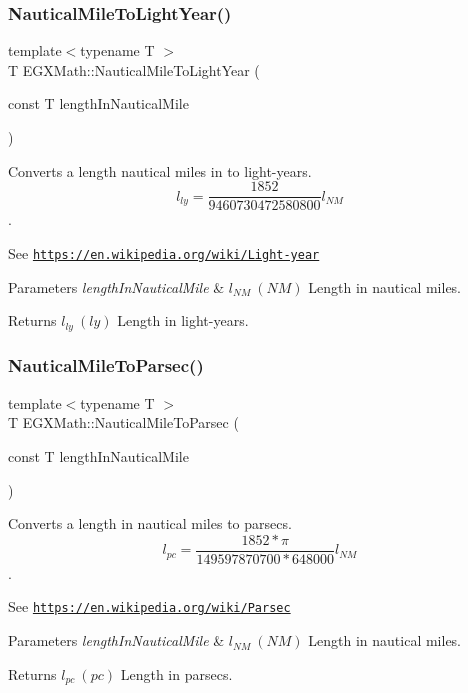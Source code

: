 \subsubsection{\texorpdfstring{Nautical\+Mile\+To\+Light\+Year()}{NauticalMileToLightYear()}}
{\footnotesize\ttfamily template$<$typename T $>$ \\
T E\+G\+X\+Math\+::\+Nautical\+Mile\+To\+Light\+Year (\begin{DoxyParamCaption}\item[{const T}]{length\+In\+Nautical\+Mile }\end{DoxyParamCaption})}



Converts a length nautical miles in to light-\/years. \[ l_{ly}= \frac{1852}{9460730472580800} l_{NM} \]. 

See \href{https://en.wikipedia.org/wiki/Light-year}{\tt https\+://en.\+wikipedia.\+org/wiki/\+Light-\/year} 
\begin{DoxyParams}{Parameters}
{\em length\+In\+Nautical\+Mile} & $ l_{NM}\ (NM)$ Length in nautical miles. \\
\hline
\end{DoxyParams}
\begin{DoxyReturn}{Returns}
$ l_{ly}\ (ly)$ Length in light-\/years. 
\end{DoxyReturn}
\mbox{\label{group___e_g_x_math-_conversions-_length_conversions-_nautical-_nautical_mile-_astronomical_ga9ef59718174cef0ecf43e8eff8b961fe}} 
\subsubsection{\texorpdfstring{Nautical\+Mile\+To\+Parsec()}{NauticalMileToParsec()}}
{\footnotesize\ttfamily template$<$typename T $>$ \\
T E\+G\+X\+Math\+::\+Nautical\+Mile\+To\+Parsec (\begin{DoxyParamCaption}\item[{const T}]{length\+In\+Nautical\+Mile }\end{DoxyParamCaption})}



Converts a length in nautical miles to parsecs. \[ l_{pc}=\frac{1852 * \pi}{149597870700 * 648000} l_{NM} \]. 

See \href{https://en.wikipedia.org/wiki/Parsec}{\tt https\+://en.\+wikipedia.\+org/wiki/\+Parsec} 
\begin{DoxyParams}{Parameters}
{\em length\+In\+Nautical\+Mile} & $ l_{NM}\ (NM)$ Length in nautical miles. \\
\hline
\end{DoxyParams}
\begin{DoxyReturn}{Returns}
$ l_{pc}\ (pc)$ Length in parsecs. 
\end{DoxyReturn}
